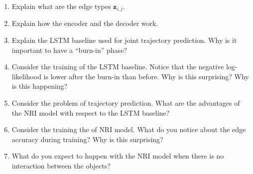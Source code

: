 \documentclass{article}
\begin{document}
\begin{enumerate}
	\item Explain what are the edge types $\mathbf{z}_{i,j}$.
	\item Explain how the encoder and the decoder work.
	\item Explain the LSTM baseline used for joint trajectory prediction. Why is it important to have a ``burn-in'' phase?
	\item Consider the training of the LSTM baseline. Notice that the negative log-likelihood is lower after the burn-in than before. Why is this surprising? Why is this happening?
	\item Consider the problem of trajectory prediction. What are the advantages of the NRI model with respect to the LSTM baseline?
	\item Consider the training the of NRI model. What do you notice about the edge accuracy during training? Why is this surprising? 
	\item What do you expect to happen with the NRI model when there is no interaction between the objects?
\end{enumerate}
\end{document}

